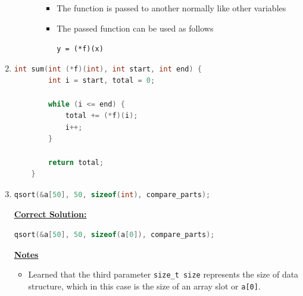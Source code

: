 \documentclass[12pt]{article}
\begin{document}
\begin{enumerate}[1.]
\begin{itemize}
\begin{itemize}
            \begin{itemize}
                \item The function is passed to another normally like other variables
                \item The passed function can be used as follows

                \bigskip

                \texttt{y = (*f)(x)}
            \end{itemize}

        \end{itemize}
    \end{itemize}

    \item

\begin{lstlisting}[language=c]
    int sum(int (*f)(int), int start, int end) {
        int i = start, total = 0;

        while (i <= end) {
            total += (*f)(i);
            i++;
        }

        return total;
    }
\end{lstlisting}

    \item

\begin{lstlisting}[language=c]
    qsort(&a[50], 50, sizeof(int), compare_parts);
\end{lstlisting}


    \bigskip

    \begin{mdframed}
    \underline{\textbf{Correct Solution:}}

    \bigskip

\begin{lstlisting}[language=c]
    qsort(&a[50], 50, sizeof(a[0]), compare_parts);
\end{lstlisting}


    \end{mdframed}

    \bigskip

    \underline{\textbf{Notes}}

    \begin{itemize}
        \item Learned that the third parameter \texttt{size\_t size} represents
        the size of data structure, which in this case is the size of an array slot or \texttt{a[0]}.

        \bigskip


\end{itemize}
\end{enumerate}
\end{document}
